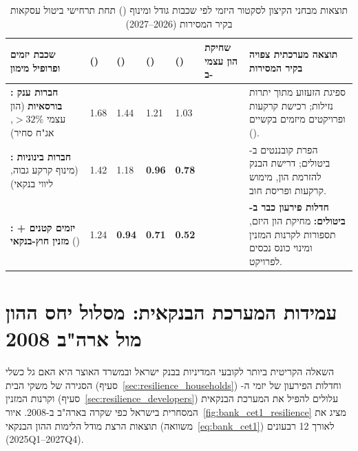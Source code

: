 \begin{table}[htbp]
\caption{תוצאות מבחני הקיצון לסקטור היזמי לפי שכבות גודל ומינוף () תחת תרחישי ביטול עסקאות בקיר המסירות (\num{2026}--\num{2027})}
\label{tab:developer_stress_results}
\centering
\footnotesize
\renewcommand{\arraystretch}{1.26}
\begin{tabularx}{\textwidth}{R{2.5cm} C{1.5cm} C{1.5cm} C{1.5cm} C{1.5cm} C{2.0cm} Y}
\toprule
{}
\textbf{שכבת יזמים ופרופיל מימון} & \textbf{ ()} & \textbf{ ()} & \textbf{ ()} & \textbf{ ()} & \textbf{שחיקת הון עצמי ב-} & \textbf{תוצאה מערכתית צפויה בקיר המסירות} \\
\midrule
\textbf{: חברות ענק בורסאיות} (הון עצמי $>32\%$, אג"ח סחיר) & \num{1.68} & \num{1.44} & \num{1.21} & \num{1.03} &  & ספיגת הזעזוע מתוך יתרות נזילות; רכישת קרקעות ופרויקטים מיזמים בקשיים (). \\
\textbf{: חברות בינוניות} (מינוף קרקע גבוה, ליווי בנקאי) & \num{1.42} & \num{1.18} & \textbf{\color{BrandRed}\num{0.96}} & \textbf{\color{BrandRed}\num{0.78}} &  & הפרת קובננטים ב- ביטולים; דרישת הבנק להזרמת הון, מימוש קרקעות ופריסת חוב. \\
\textbf{: יזמים קטנים + מזנין חוץ-בנקאי} () & \num{1.24} & \textbf{\color{BrandRed}\num{0.94}} & \textbf{\color{BrandRed}\num{0.71}} & \textbf{\color{BrandRed}\num{0.52}} & \textbf{\color{BrandRed}} & \textbf{חדלות פירעון כבר ב- ביטולים:} מחיקת הון היזם, תספורות לקרנות המזנין ומינוי כונס נכסים לפרויקט. \\
\bottomrule
\end{tabularx}
\end{table}

\section{עמידות המערכת הבנקאית: מסלול יחס ההון  מול ארה"ב \num{2008}}
\label{sec:resilience_banks}

השאלה הקריטית ביותר לקובעי המדיניות בבנק ישראל ובמשרד האוצר היא האם גל כשלי הסגירה של משקי הבית (סעיף~\ref{sec:resilience_households}) וחדלות הפירעון של יזמי ה- וקרנות המזנין (סעיף~\ref{sec:resilience_developers}) עלולים להפיל את המערכת הבנקאית המסחרית בישראל כפי שקרה בארה"ב ב-\num{2008}. איור~\ref{fig:bank_cet1_resilience} מציג את תוצאות הרצת מודל הלימות ההון הבנקאי (משוואה~\eqref{eq:bank_cet1}) לאורך \num{12} רבעונים (\num{2025Q1}--\num{2027Q4}).

